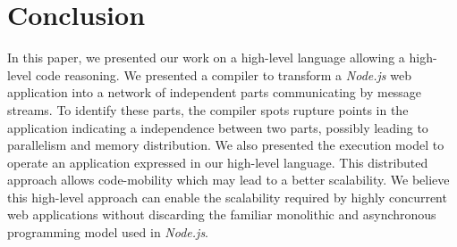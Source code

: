 \section{Conclusion} \label{section:conclusion}


In this paper, we presented our work on a high-level language allowing a high-level code reasoning.
We presented a compiler to transform a \textit{Node.js} web application into a network of independent parts communicating by message streams.
To identify these parts, the compiler spots rupture points in the application indicating a independence between two parts, possibly leading to parallelism and memory distribution.
We also presented the execution model to operate an application expressed in our high-level language.
This distributed approach allows code-mobility which may lead to a better scalability.
We believe this high-level approach can enable the scalability required by highly concurrent web applications without discarding the familiar monolithic and asynchronous programming model used in \textit{Node.js}.